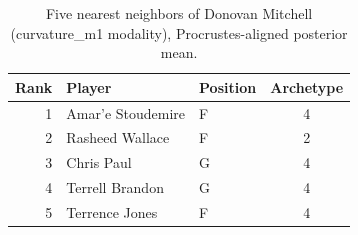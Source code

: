 \begin{table}[htbp]
  \centering\small
  \begin{tabular}{rllc}
    \toprule
    Rank & Player & Position & Archetype \\
    \midrule
    1 & Amar'e Stoudemire & F & 4 \\
    2 & Rasheed Wallace & F & 2 \\
    3 & Chris Paul & G & 4 \\
    4 & Terrell Brandon & G & 4 \\
    5 & Terrence Jones & F & 4 \\
    \bottomrule
  \end{tabular}
  \caption{Five nearest neighbors of Donovan Mitchell (curvature_m1 modality), Procrustes-aligned posterior mean.}
  \label{tab:Donovan_Mitchell_neighbors_curvature_m1}
\end{table}

